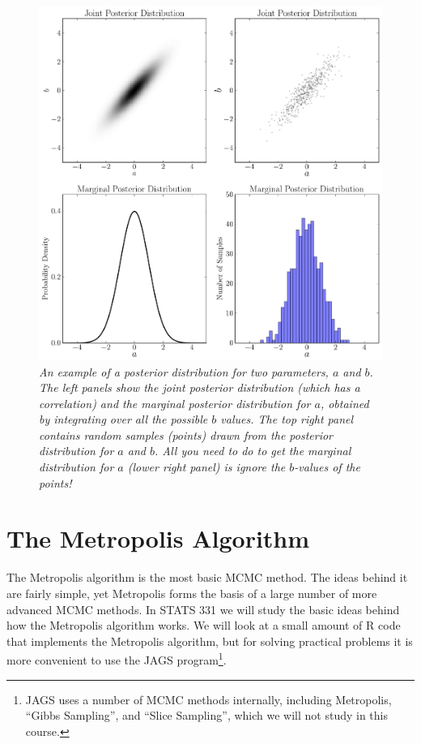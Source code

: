 \begin{figure}[ht!]
\begin{center}
\includegraphics[scale=0.5]{Figures/marginalisation.pdf}
\caption{\it An example of a posterior distribution for two parameters, $a$ and
$b$. The left panels show the joint posterior distribution (which has a
correlation) and the marginal posterior distribution for $a$, obtained by
integrating over all the possible $b$ values. The top right panel contains
random samples
(points) drawn from the posterior distribution for $a$ and $b$.
All you need to do to get the
marginal distribution for $a$ (lower right panel) is ignore the $b$-values of
the points!
\label{fig:marginalisation}}
\end{center}
\end{figure}


\section{The Metropolis Algorithm}
The Metropolis algorithm is the most basic MCMC method.
The ideas behind it are fairly simple, yet Metropolis forms the basis of a large
number of more advanced MCMC methods. In STATS 331 we will study the basic ideas
behind how the Metropolis algorithm works. We will look at a small amount of R code
that implements the Metropolis algorithm, but for solving practical problems
it is more convenient to use the JAGS program\footnote{JAGS uses a number
of MCMC methods internally, including Metropolis, ``Gibbs Sampling'', and
``Slice Sampling'', which we will not study in this course.}.

